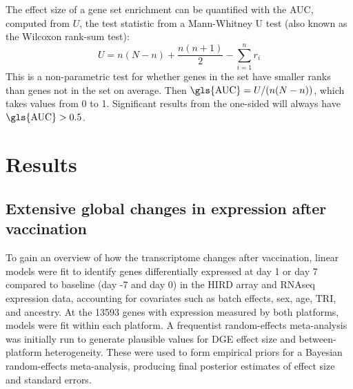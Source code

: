 The effect size of a gene set enrichment can be quantified with the \gls{AUC},
computed from $U$, the test statistic from a Mann-Whitney U test (also known as the Wilcoxon rank-sum test):
\begin{equation}
    U = n(N-n) + \frac{n(n + 1)}{2} - \sum_{i=1}^{n} r_i
\end{equation}
This is a non-parametric test for whether genes in the set have smaller ranks than genes not in the set on average.
Then $\text{\gls{AUC}} = U/(n(N-n))$, which takes values from 0 to 1.
Significant results from the one-sided  will always have $\text{\gls{AUC}} > 0.5$.
%
%

\section{Results}

\subsection{Extensive global changes in expression after vaccination}

To gain an overview of how the transcriptome changes after vaccination, linear models were fit to identify genes differentially expressed at day 1 or day 7 compared to baseline (day -7 and day 0) in the \gls{HIRD} array and \gls{RNAseq} expression data, accounting for covariates such as batch effects, sex, age, \gls{TRI}, and ancestry.
At the \num{13593} genes with expression measured by both platforms, models were fit within each platform.
A frequentist random-effects meta-analysis was initially run to generate plausible values for \gls{DGE} effect size and between-platform heterogeneity.
These were used to form empirical priors for a Bayesian random-effects meta-analysis, producing final posterior estimates of effect size and standard errors.

